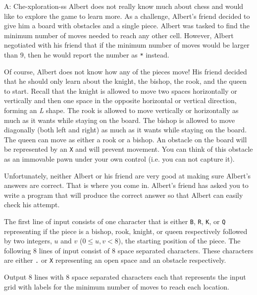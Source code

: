 \begin{problem}{A: Che-xploration-ss}
Albert does not really know much about chess and would like to explore the game to learn more.
As a challenge, Albert's friend decided to give him a board with obstacles and a single piece.
Albert was tasked to find the minimum number of moves needed to reach any other cell.
However, Albert negotiated with his friend that if the minimum number of moves would be larger than $9$, then he would report the number as \texttt{*} instead.

Of course, Albert does not know how any of the pieces move!
His friend decided that he should only learn about the knight, the bishop, the rook, and the queen to start.
Recall that the knight is allowed to move two spaces horizontally or vertically and then one space in the opposite horizontal or vertical direction, forming an \textit{L} shape.
The rook is allowed to move vertically or horizontally as much as it wants while staying on the board.
The bishop is allowed to move diagonally (both left and right) as much as it wants while staying on the board.
The queen can move as either a rook or a bishop.
An obstacle on the board will be represented by an \texttt{X} and will prevent movement.
You can think of this obstacle as an immovable pawn under your own control (i.e. you can not capture it).

Unfortunately, neither Albert or his friend are very good at making sure Albert's answers are correct.
That is where you come in.
Albert's friend has asked you to write a program that will produce the correct answer so that Albert can easily check his attempt.
\end{problem}

\begin{formalin}
The first line of input consists of one character that is either \texttt{B}, \texttt{R}, \texttt{K}, or \texttt{Q} representing if the piece is a bishop, rook, knight, or queen respectively followed by two integers, $u$ and $v$ ($0 \le u, v < 8$), the starting position of the piece.
The following 8 lines of input consist of 8 space separated characters.
These characters are either \texttt{.} or \texttt{X} representing an open space and an obstacle respectively.
\end{formalin}

\begin{formalout}
Output 8 lines with 8 space separated characters each that represents the input grid with labels for the minimum number of moves to reach each location.
\end{formalout}

